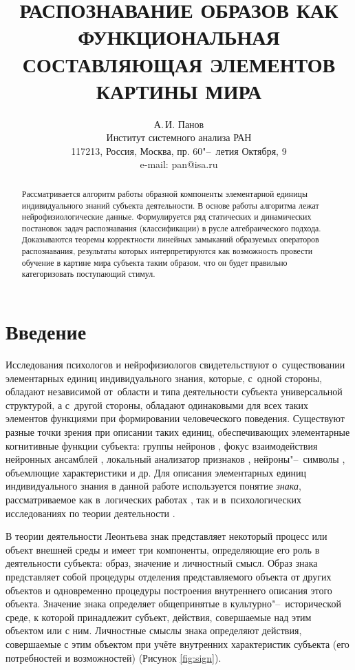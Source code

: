 \documentclass[a4paper, 12pt]{article}
\theoremstyle{plain}
\begin{document}
	\title{\MakeUppercase{Распознавание образов как функциональная составляющая элементов картины мира}}
	\author{А.\,И. Панов\\ Институт системного анализа РАН\\ 117213, Россия, Москва, пр. 60"--~летия Октября, 9\\ e-mail: pan@isa.ru}
	\date{}
	
	\maketitle

	\begin{abstract}
		Рассматривается алгоритм работы образной компоненты элементарной единицы индивидуального знаний субъекта деятельности. В основе работы алгоритма лежат нейрофизиологические данные. Формулируется ряд статических и динамических постановок задач распознавания (классификации) в русле алгебраического подхода. Доказываются теоремы корректности линейных замыканий образуемых операторов распознавания, результаты которых интерпретируются как возможность провести обучение в картине мира субъекта таким образом, что он будет правильно категоризовать поступающий стимул.
	\end{abstract}

	\section*{Введение}
	Исследования психологов и нейрофизиологов свидетельствуют о~существовании элементарных единиц индивидуального знания, которые, с~одной стороны, обладают независимой от~области и типа деятельности субъекта универсальной структурой, а с~другой стороны, обладают одинаковыми для всех таких элементов функциями при формировании человеческого поведения. Существуют разные точки зрения при описании таких единиц, обеспечивающих элементарные когнитивные функции субъекта: группы нейронов \cite{Edelmen1981}, фокус взаимодействия нейронных ансамблей \cite{IvanitskyE1996}, локальный анализатор признаков \cite{Vartanov2011}, нейроны"--~символы \cite{Chernavsky2012}, объемлющие характеристики \cite{Sergin2009} и др. Для описания элементарных единиц индивидуального знания в данной работе используется понятие \textit{знака}, рассматриваемое как в~логических работах \cite{Frege2000,Pirs2000}, так и в~психологических исследованиях по теории деятельности \cite{Leontiev1975}.

	В теории деятельности Леонтьева знак представляет некоторый процесс или объект внешней среды и имеет три компоненты, определяющие его роль в деятельности субъекта: образ, значение и личностный смысл. Образ знака представляет собой процедуры отделения представляемого объекта от других объектов и одновременно процедуры построения внутреннего описания этого объекта. Значение знака определяет общепринятые в культурно"--~исторической среде, к которой принадлежит субъект, действия, совершаемые над этим объектом или с ним. Личностные смыслы знака определяют действия, совершаемые с этим объектом при учёте внутренних характеристик субъекта (его потребностей и возможностей) (Рисунок \ref{fig:sign}).
	
\end{document}
